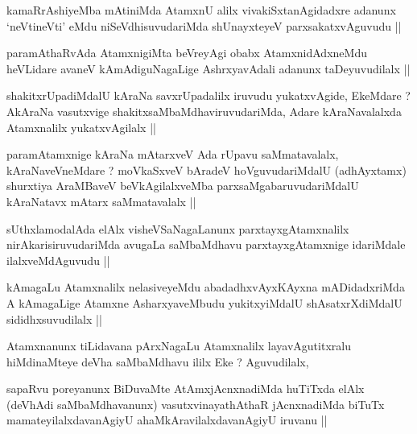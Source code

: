 \begin{artha}
kamaRrAshiyeMba mAtiniMda AtamxnU alilx vivakiSxtanAgidadxre adanunx
`neVtineVti' eMdu niSeVdhisuvudariMda shUnayxteyeV parxsakatxvAguvudu ||
\end{artha}


\begin{artha}
paramAthaRvAda AtamxnigiMta beVreyAgi obabx AtamxnidAdxneMdu heVLidare
avaneV kAmAdiguNagaLige AshrxyavAdali adanunx taDeyuvudilalx ||
\end{artha}

\begin{artha}
shakitxrUpadiMdalU kAraNa savxrUpadalilx iruvudu yukatxvAgide,
EkeMdare ? AkAraNa vasutxvige shakitxsaMbaMdhaviruvudariMda, Adare
kAraNavalalxda Atamxnalilx yukatxvAgilalx ||
\end{artha}

\begin{artha}
paramAtamxnige kAraNa mAtarxveV Ada rUpavu saMmatavalalx,
kAraNaveVneMdare ? moVkaSxveV bAradeV hoVguvudariMdalU (adhAyxtamx)
shurxtiya AraMBaveV beVkAgilalxveMba parxsaMgabaruvudariMdalU
kAraNatavx mAtarx saMmatavalalx ||
\end{artha}


\begin{artha}
sUthxlamodalAda elAlx visheVSaNagaLanunx parxtayxgAtamxnalilx
nirAkarisiruvudariMda avugaLa saMbaMdhavu parxtayxgAtamxnige
idariMdale ilalxveMdAguvudu ||
\end{artha}


\begin{artha}
kAmagaLu Atamxnalilx nelasiveyeMdu abadadhxvAyxKAyxna mADidadxriMda A
kAmagaLige Atamxne AsharxyaveMbudu yukitxyiMdalU shAsatxrXdiMdalU
sididhxsuvudilalx ||
\end{artha}


\begin{artha}
Atamxnanunx tiLidavana pArxNagaLu Atamxnalilx layavAgutitxralu
hiMdinaMteye deVha saMbaMdhavu ililx Eke ? Aguvudilalx,
\end{artha}


\begin{artha}
sapaRvu poreyanunx BiDuvaMte AtAmxjAcnxnadiMda huTiTxda elAlx (deVhAdi
saMbaMdhavanunx) vasutxvinayathAthaR jAcnxnadiMda biTuTx
mamateyilalxdavanAgiyU ahaMkAravilalxdavanAgiyU iruvanu ||
\end{artha}

